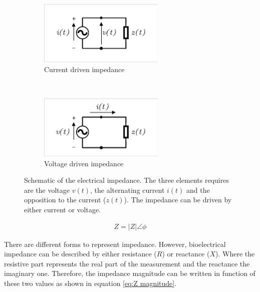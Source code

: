 \begin{figure}[!htpb]
	\centering
	\begin{subfigure}[t]{0.4\textwidth}
		\centering
		\includegraphics[width=6cm,trim={0.05cm 0.05cm 0.05cm 0.15cm},clip,keepaspectratio]{figure0a}    
		\caption{Current driven impedance}
		\label{fig:impedance a}
	\end{subfigure}
	~
	\begin{subfigure}[t]{0.4\textwidth}
		\centering
		\includegraphics[width=6cm,trim={0.05cm 0.05cm 0.05cm 0.15cm},clip,keepaspectratio]{figure0b}    
		\caption{Voltage driven impedance}
		\label{fig:impedance b}
	\end{subfigure}
	\caption[Impedance representation from two-terminal element]{Schematic of the electrical impedance. The three elements requires are the voltage $v(t)$, the alternating current $i(t)$ and the opposition to the current ($z(t)$). The impedance can be driven by either current or voltage.}
	\label{fig:impedance}
\end{figure}

\begin{align}
	\label{eq:phasor}
	Z = \lvert Z \rvert  \angle \phi
\end{align}

There are different forms to represent impedance. However, bioelectrical impedance can be described by either resistance ($R$) or reactance ($X$). Where the resistive part represents the real part of the measurement and the reactance the imaginary one. Therefore, the impedance magnitude can be written in function of these two values as shown in equation \ref{eq:Z magnitude}.

